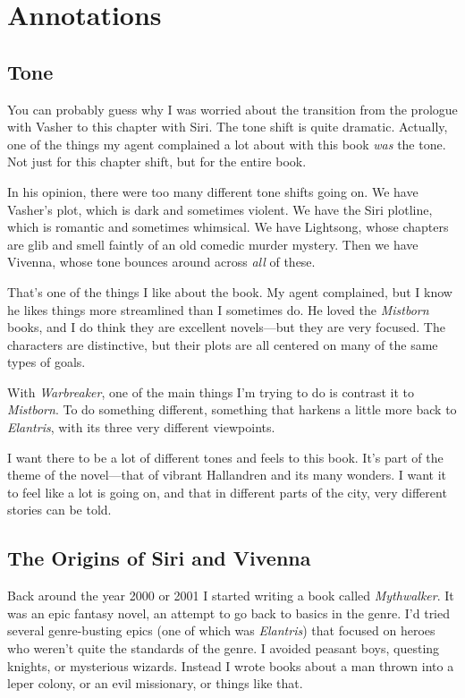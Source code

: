 \section*{Annotations}

\subsection*{Tone}

You can probably guess why I was worried about the transition from the prologue with Vasher to this chapter with Siri. The tone shift is quite dramatic. Actually, one of the things my agent complained a lot about with this book \textit{was} the tone. Not just for this chapter shift, but for the entire book.

In his opinion, there were too many different tone shifts going on. We have Vasher’s plot, which is dark and sometimes violent. We have the Siri plotline, which is romantic and sometimes whimsical. We have Lightsong, whose chapters are glib and smell faintly of an old comedic murder mystery. Then we have Vivenna, whose tone bounces around across \textit{all} of these.

That’s one of the things I like about the book. My agent complained, but I know he likes things more streamlined than I sometimes do. He loved the \textit{Mistborn} books, and I do think they are excellent novels—but they are very focused. The characters are distinctive, but their plots are all centered on many of the same types of goals.

With \textit{Warbreaker}, one of the main things I’m trying to do is contrast it to \textit{Mistborn}. To do something different, something that harkens a little more back to \textit{Elantris}, with its three very different viewpoints.

I want there to be a lot of different tones and feels to this book. It’s part of the theme of the novel—that of vibrant Hallandren and its many wonders. I want it to feel like a lot is going on, and that in different parts of the city, very different stories can be told.

\subsection*{The Origins of Siri and Vivenna}

Back around the year 2000 or 2001 I started writing a book called \textit{Mythwalker}. It was an epic fantasy novel, an attempt to go back to basics in the genre. I’d tried several genre-busting epics (one of which was \textit{Elantris}) that focused on heroes who weren’t quite the standards of the genre. I avoided peasant boys, questing knights, or mysterious wizards. Instead I wrote books about a man thrown into a leper colony, or an evil missionary, or things like that.

